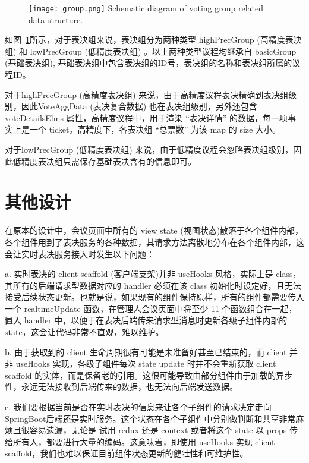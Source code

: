   \begin{figure}[!htp]
    \centering
    \texttt{[image: group.png]}
      {Schematic diagram of voting group related data structure.}
   \label{fig:group}
  \end{figure}

  如图~\ref{fig:group}所示，对于表决组来说，表决组分为两种类型 highPrecGroup (高精度表决组) 和 lowPrecGroup (低精度表决组) 。以上两种类型议程均继承自 basicGroup (基础表决组), 基础表决组中包含表决组的ID号，表决组的名称和表决组所属的议程ID。
  
  对于highPrecGroup (高精度表决组) 来说，由于高精度议程表决精确到表决组级别，因此VoteAggData (表决复合数据) 也在表决组级别，另外还包含 voteDetailsElms 属性，高精度议程中，用于渲染 “表决详情” 的数据，每一项事实上是一个 ticket。高精度下，各表决组 “总票数” 为该 map 的 size 大小。

  对于lowPrecGroup (低精度表决组) 来说，由于低精度议程会忽略表决组级别，因此低精度表决组只需保存基础表决含有的信息即可。

  \section{其他设计}
  在原本的设计中，会议页面中所有的 view state (视图状态)散落于各个组件内部，各个组件用到了表决服务的各种数据，其请求方法离散地分布在各个组件内部，这会让实时表决服务接入时发生以下问题：

  \quad{}a. 实时表决的 client scaffold (客户端支架)并非 useHooks 风格，实际上是 class，其所有的后端请求型数据对应的 handler 必须在该 class 初始化时设定好，且无法接受后续状态更新。也就是说，如果现有的组件保持原样，所有的组件都需要传入一个 realtimeUpdate 函数，在管理人会议页面中将至少 11 个函数组合在一起，置入 handler 中，以便于在表决后端传来请求型消息时更新各级子组件内部的 state，这会让代码非常不直观，难以维护。

  \quad{}b. 由于获取到的 client 生命周期很有可能是未准备好甚至已结束的，而 client 并非 useHooks 实现，各级子组件每次 state update 时并不会重新获取 client scaffold 的实体，而是保留老的引用。这很可能导致由部分组件由于加载的异步性，永远无法接收到后端传来的数据，也无法向后端发送数据。

  \quad{}c. 我们要根据当前是否在实时表决的信息来让各个子组件的请求决定走向 SpringBoot后端还是实时服务。这个状态在各个子组件中分别做判断和共享非常麻烦且很容易遗漏，无论是 试用 redux 还是 context 或者将这个 state 以 props 传给所有人，都要进行大量的编码。这意味着，即使用 useHooks 实现 client scaffold，我们也难以保证目前组件状态更新的健壮性和可维护性。

